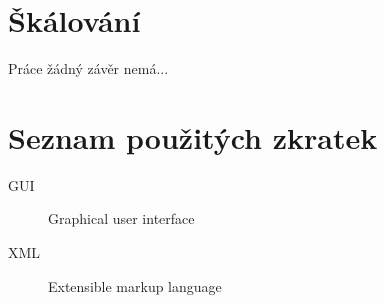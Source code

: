 \documentclass[thesis=M,czech]{FITthesis}[2012/06/26]
\begin{document}
\chapter{Škálování}



\begin{conclusion}

Práce žádný závěr nemá...

\end{conclusion}




\appendix

\chapter{Seznam použitých zkratek}
\begin{description}
	\item[GUI] Graphical user interface
	\item[XML] Extensible markup language
\end{description}
\end{document}

